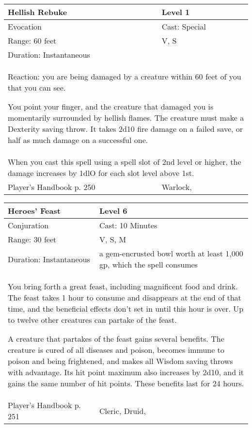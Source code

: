 \documentclass[11pt]{report}
\begin{document}
\begin{table}[H]
	\begin{tabular}{||p{6cm}|p{6cm}||}
		\hline\hline
		\bf{Hellish Rebuke} & Level 1\\ \hline
		Evocation & Cast: Special\\ \hline
		Range: 60 feet & V, S\\ \hline
		Duration: Instantaneous & \\ \hline
		\multicolumn{2}{||p{12cm}||}{Reaction: you are being damaged by a creature within 60 feet of you that you can see.

You point your finger, and the creature that damaged you is momentarily surrounded by hellish flames. The creature must make a Dexterity saving throw. It takes 2d10 fire damage on a failed save, or half as much damage on a successful one.}\\ \hline
		\multicolumn{2}{||p{12cm}||}{When you cast this spell using a spell slot of 2nd level or higher, the damage increases by 1dlO for each slot level above 1st.}\\ \hline
Player's Handbook p. 250 & Warlock, \\ \hline\hline
	\end{tabular}
\end{table}

\begin{table}[H]
	\begin{tabular}{||p{6cm}|p{6cm}||}
		\hline\hline
		\bf{Heroes’ Feast} & Level 6\\ \hline
		Conjuration & Cast: 10 Minutes\\ \hline
		Range: 30 feet & V, S, M\\ \hline
		Duration: Instantaneous & a gem-encrusted bowl worth at least 1,000 gp, which the spell consumes\\ \hline
		\multicolumn{2}{||p{12cm}||}{You bring forth a great feast, including magnificent food and drink. The feast takes 1 hour to consume and disappears at the end of that time, and the beneficial effects don’t set in until this hour is over. Up to twelve other creatures can partake of the feast.

A creature that partakes of the feast gains several benefits. The creature is cured of all diseases and poison, becomes immune to poison and being frightened, and makes all Wisdom saving throws with advantage. Its hit point maximum also increases by 2d10, and it gains the same number of hit points. These benefits last for 24 hours.}\\ \hline
Player's Handbook p. 251 & Cleric, Druid, \\ \hline\hline
	\end{tabular}
\end{table}
\end{document}
